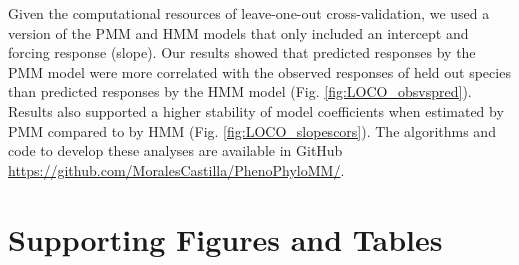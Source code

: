 \documentclass[11pt]{article}
\begin{document}
Given the computational resources of leave-one-out  cross-validation, we used a version of the PMM and HMM models that only included an intercept and forcing response (slope). Our results showed that predicted responses by the PMM model were more correlated with the observed responses of held out species than predicted responses by the HMM model (Fig. \ref{fig:LOCO_obsvspred}). Results also supported a higher stability of model coefficients when estimated by PMM compared to by HMM (Fig. \ref{fig:LOCO_slopescors}). %
The algorithms and code to develop these analyses are available in GitHub \url{https://github.com/MoralesCastilla/PhenoPhyloMM/}.


\clearpage








\clearpage
\section*{Supporting Figures and Tables}
\end{document}
